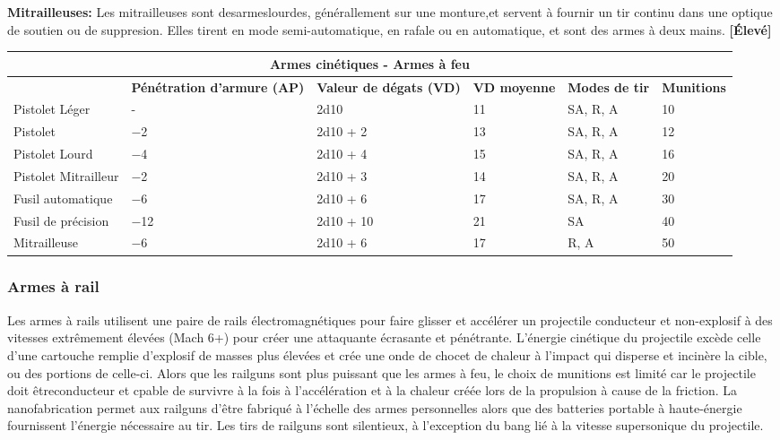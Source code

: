 \textbf{Mitrailleuses:} Les mitrailleuses sont desarmeslourdes, générallement sur une monture,et servent à fournir un tir continu dans une optique de soutien ou de suppresion. Elles tirent en mode semi-automatique, en rafale ou en automatique, et sont des armes à deux mains. \textbf{[Élevé]} 

\begin{table} \begin{tabularx}{\textwidth}{|l|X|X|X|l|l|} \hline

\multicolumn{6}{|c|}{\textbf{Armes cinétiques - Armes à feu}} \\ \hline

&\textbf{Pénétration d'armure (AP)}	&\textbf{Valeur de dégats (VD)}	&\textbf{VD moyenne}	&\textbf{Modes de tir}	&\textbf{Munitions} \\ \hline

Pistolet Léger	&- &2d10	&11	&SA, R, A	&10 \\ \hline

Pistolet	&$-$2	&2d10 + 2	&13	&SA, R, A	&12 \\ \hline

Pistolet Lourd	&$-$4	&2d10 + 4	&15	&SA, R, A	&16 \\ \hline

Pistolet Mitrailleur	&$-$2	&2d10 + 3	&14	&SA, R, A	&20 \\ \hline

Fusil automatique	&$-$6	&2d10 + 6	&17	&SA, R, A	&30 \\ \hline

Fusil de précision	&$-$12	&2d10 + 10	&21	&SA	&40 \\ \hline

Mitrailleuse	&$-$6	&2d10 + 6	&17	&R, A	&50 \\ \hline

\end{tabularx} \label{tab:kinetic-firearms} \end{table} 

\subsubsection{Armes à rail} 

Les armes à rails utilisent une paire de rails électromagnétiques pour faire glisser et accélérer un projectile conducteur et non-explosif à des vitesses extrêmement élevées (Mach 6+) pour créer une attaquante écrasante et pénétrante. L'énergie cinétique du projectile excède celle d'une cartouche remplie d'explosif de masses plus élevées et crée une onde de chocet de chaleur à l'impact qui disperse et incinère la cible, ou des portions de celle-ci. Alors que les railguns sont plus puissant que les armes à feu, le choix de munitions est limité car le projectile doit êtreconducteur et cpable de survivre à la fois à l'accélération et à la chaleur créée lors de la propulsion à cause de la friction. La nanofabrication permet aux railguns d'être fabriqué à l'échelle des armes personnelles alors que des batteries portable à haute-énergie fournissent l'énergie nécessaire au tir. Les tirs de railguns sont silentieux, à l'exception du bang lié à la vitesse supersonique du projectile. 


